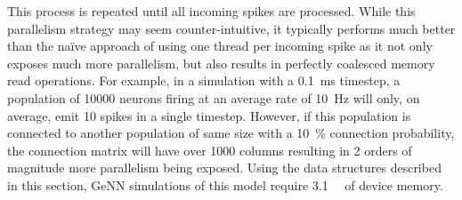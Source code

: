 \documentclass[utf8]{frontiersSCNS} %
\begin{document}
This process is repeated until all incoming spikes are processed.
While this parallelism strategy may seem counter-intuitive, it typically performs much better than the naïve approach of using one thread per incoming spike as it not only exposes much more parallelism, but also results in perfectly coalesced memory read operations.
For example, in a simulation with a \SI{0.1}{\milli\second} timestep, a population of \num{10000} neurons firing at an average rate of \SI{10}{\hertz} will only, on average, emit \num{10} spikes in a single timestep.
However, if this population is connected to another population of same size with a \SI{10}{\percent} connection probability, the connection matrix will have over \num{1000} columns resulting in 2 orders of magnitude more parallelism being exposed.
Using the data structures described in this section, GeNN simulations of this model require \SI{3.1}{\giga\byte} of device memory.
\end{document}
